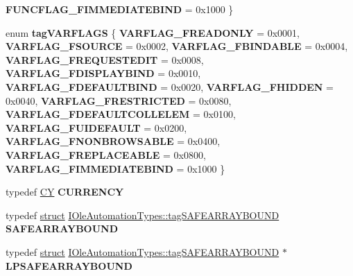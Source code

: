 \begin{DoxyCompactItemize}
\newline
{\bfseries F\+U\+N\+C\+F\+L\+A\+G\+\_\+\+F\+I\+M\+M\+E\+D\+I\+A\+T\+E\+B\+I\+ND} = 0x1000
 \}
\item 
\mbox{\label{interface_i_ole_automation_types_a2524f05887634eb75e48179f0477e6fa}} 
enum {\bfseries tag\+V\+A\+R\+F\+L\+A\+GS} \{ \newline
{\bfseries V\+A\+R\+F\+L\+A\+G\+\_\+\+F\+R\+E\+A\+D\+O\+N\+LY} = 0x0001, 
{\bfseries V\+A\+R\+F\+L\+A\+G\+\_\+\+F\+S\+O\+U\+R\+CE} = 0x0002, 
{\bfseries V\+A\+R\+F\+L\+A\+G\+\_\+\+F\+B\+I\+N\+D\+A\+B\+LE} = 0x0004, 
{\bfseries V\+A\+R\+F\+L\+A\+G\+\_\+\+F\+R\+E\+Q\+U\+E\+S\+T\+E\+D\+IT} = 0x0008, 
\newline
{\bfseries V\+A\+R\+F\+L\+A\+G\+\_\+\+F\+D\+I\+S\+P\+L\+A\+Y\+B\+I\+ND} = 0x0010, 
{\bfseries V\+A\+R\+F\+L\+A\+G\+\_\+\+F\+D\+E\+F\+A\+U\+L\+T\+B\+I\+ND} = 0x0020, 
{\bfseries V\+A\+R\+F\+L\+A\+G\+\_\+\+F\+H\+I\+D\+D\+EN} = 0x0040, 
{\bfseries V\+A\+R\+F\+L\+A\+G\+\_\+\+F\+R\+E\+S\+T\+R\+I\+C\+T\+ED} = 0x0080, 
\newline
{\bfseries V\+A\+R\+F\+L\+A\+G\+\_\+\+F\+D\+E\+F\+A\+U\+L\+T\+C\+O\+L\+L\+E\+L\+EM} = 0x0100, 
{\bfseries V\+A\+R\+F\+L\+A\+G\+\_\+\+F\+U\+I\+D\+E\+F\+A\+U\+LT} = 0x0200, 
{\bfseries V\+A\+R\+F\+L\+A\+G\+\_\+\+F\+N\+O\+N\+B\+R\+O\+W\+S\+A\+B\+LE} = 0x0400, 
{\bfseries V\+A\+R\+F\+L\+A\+G\+\_\+\+F\+R\+E\+P\+L\+A\+C\+E\+A\+B\+LE} = 0x0800, 
\newline
{\bfseries V\+A\+R\+F\+L\+A\+G\+\_\+\+F\+I\+M\+M\+E\+D\+I\+A\+T\+E\+B\+I\+ND} = 0x1000
 \}
\item 
\mbox{\label{interface_i_ole_automation_types_a528e19bf829e73c208e92564736a34ca}} 
typedef \hyperlink{uniontag_c_y}{CY} {\bfseries C\+U\+R\+R\+E\+N\+CY}
\item 
\mbox{\label{interface_i_ole_automation_types_a996144dae62442fc38285dd9183dde76}} 
typedef \hyperlink{interfacestruct}{struct} \hyperlink{struct_i_ole_automation_types_1_1tag_s_a_f_e_a_r_r_a_y_b_o_u_n_d}{I\+Ole\+Automation\+Types\+::tag\+S\+A\+F\+E\+A\+R\+R\+A\+Y\+B\+O\+U\+ND} {\bfseries S\+A\+F\+E\+A\+R\+R\+A\+Y\+B\+O\+U\+ND}
\item 
\mbox{\label{interface_i_ole_automation_types_a536779a7b2b31409e1aefee7825add35}} 
typedef \hyperlink{interfacestruct}{struct} \hyperlink{struct_i_ole_automation_types_1_1tag_s_a_f_e_a_r_r_a_y_b_o_u_n_d}{I\+Ole\+Automation\+Types\+::tag\+S\+A\+F\+E\+A\+R\+R\+A\+Y\+B\+O\+U\+ND} $\ast$ {\bfseries L\+P\+S\+A\+F\+E\+A\+R\+R\+A\+Y\+B\+O\+U\+ND}

\end{DoxyCompactItemize}

